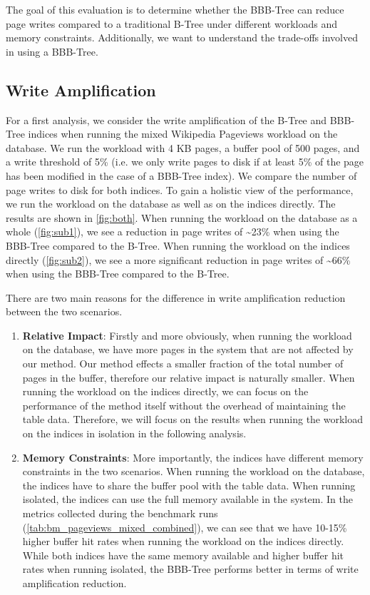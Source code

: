The goal of this evaluation is to determine whether the BBB-Tree can reduce page writes compared to a traditional B-Tree under different workloads and memory constraints.
Additionally, we want to understand the trade-offs involved in using a BBB-Tree.

\subsection*{Write Amplification}
For a first analysis, we consider the write amplification of the B-Tree and BBB-Tree indices when running the mixed Wikipedia Pageviews workload on the database.
We run the workload with 4 KB pages, a buffer pool of 500 pages, and a write threshold of 5\% (i.e. we only write pages to disk if at least 5\% of the page has been modified in the case of a BBB-Tree index).
We compare the number of page writes to disk for both indices.
To gain a holistic view of the performance, we run the workload on the database as well as on the indices directly.
The results are shown in \autoref{fig:both}.
When running the workload on the database as a whole (\autoref{fig:sub1}), we see a reduction in page writes of \textasciitilde23\% when using the BBB-Tree compared to the B-Tree.
When running the workload on the indices directly (\autoref{fig:sub2}), we see a more significant reduction in page writes of \textasciitilde66\% when using the BBB-Tree compared to the B-Tree.

There are two main reasons for the difference in write amplification reduction between the two scenarios.
\begin{enumerate}
  \item \textbf{Relative Impact}: Firstly and more obviously, when running the workload on the database, we have more pages in the system that are not affected by our method.
Our method effects a smaller fraction of the total number of pages in the buffer, therefore our relative impact is naturally smaller.
When running the workload on the indices directly, we can focus on the performance of the method itself without the overhead of maintaining the table data.
Therefore, we will focus on the results when running the workload on the indices in isolation in the following analysis.
  \item \textbf{Memory Constraints}: More importantly, the indices have different memory constraints in the two scenarios.
When running the workload on the database, the indices have to share the buffer pool with the table data.
When running isolated, the indices can use the full memory available in the system. 
In the metrics collected during the benchmark runs (\autoref{tab:bm_pageviews_mixed_combined}), we can see that we have 10-15\% higher buffer hit rates when running the workload on the indices directly.
While both indices have the same memory available and higher buffer hit rates when running isolated, the BBB-Tree performs better in terms of write amplification reduction.
\end{enumerate}

